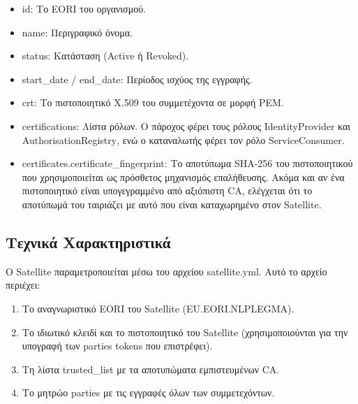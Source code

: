 \begin{itemize}
    \item \textlatin{id}: Το \textlatin{EORI} του οργανισμού.
    \item \textlatin{name}: Περιγραφικό όνομα.
    \item \textlatin{status}: Κατάσταση (\textlatin{Active} ή
    \textlatin{Revoked}).
    \item \textlatin{start\_date} / \textlatin{end\_date}: Περίοδος
    ισχύος της εγγραφής.
    \item \textlatin{crt}: Το πιστοποιητικό \textlatin{X.509}
    του συμμετέχοντα σε μορφή \textlatin{PEM}.
    \item \textlatin{certifications}: Λίστα ρόλων. Ο πάροχος
    φέρει τους ρόλους \textlatin{IdentityProvider} και
    \textlatin{AuthorisationRegistry}, ενώ ο καταναλωτής φέρει τον
    ρόλο \textlatin{ServiceConsumer}.
    \item \textlatin{certificates.certificate\_fingerprint}: Το
    αποτύπωμα \textlatin{SHA-256} του πιστοποιητικού που χρησιμοποιείται
    ως πρόσθετος μηχανισμός επαλήθευσης. Ακόμα και αν ένα
    πιστοποιητικό είναι υπογεγραμμένο από αξιόπιστη \textlatin{CA},
    ελέγχεται ότι το αποτύπωμά του ταιριάζει με αυτό που είναι
    καταχωρημένο στον \textlatin{Satellite}.
\end{itemize}

\subsection{Τεχνικά Χαρακτηριστικά}
\label{subsec:satellite-tech}

Ο \textlatin{Satellite} παραμετροποιείται μέσω του αρχείου
\textlatin{satellite.yml}. Αυτό το αρχείο περιέχει:

\begin{enumerate}
    \item Το αναγνωριστικό \textlatin{EORI} του \textlatin{Satellite}
    (\textlatin{EU.EORI.NLPLEGMA}).
    \item Το ιδιωτικό κλειδί και το πιστοποιητικό του
    \textlatin{Satellite} (χρησιμοποιούνται για την υπογραφή
    των \textlatin{parties tokens} που επιστρέφει).
    \item Τη λίστα \textlatin{trusted\_list} με τα αποτυπώματα
    εμπιστευμένων \textlatin{CA}.
    \item Το μητρώο \textlatin{parties} με τις εγγραφές όλων
    των συμμετεχόντων.
\end{enumerate}

